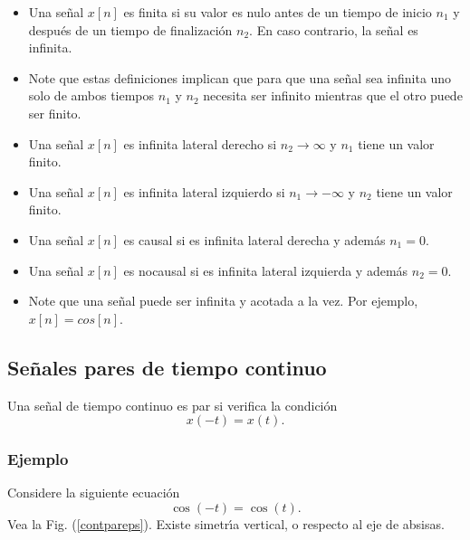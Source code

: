 \begin{itemize}
\item Una se\~{n}al $x[n]$ es finita si su valor es nulo antes de un
  tiempo de inicio $n_{1}$ y despu\'{e}s de un tiempo de
  finalizaci\'{o}n $n_{2}$. En caso contrario, la se\~{n}al es
  infinita.

\item Note que estas definiciones implican que para que una se\~{n}al
  sea infinita uno solo de ambos tiempos $n_{1}$ y $n_{2}$ necesita
  ser infinito mientras que el otro puede ser finito.
        
\item Una se\~{n}al $x[n]$ es infinita lateral derecho si $n_{2}
  \rightarrow \infty$ y $n_{1}$ tiene un valor finito.
        
\item Una se\~{n}al $x[n]$ es infinita lateral izquierdo si $n_{1}
  \rightarrow -\infty$ y $n_{2}$ tiene un valor finito.
        
\item Una se\~{n}al $x[n]$ es causal si es infinita lateral derecha y
  adem\'{a}s $n_{1} = 0$.
        
\item Una se\~{n}al $x[n]$ es nocausal si es infinita lateral
  izquierda y adem\'{a}s $n_{2} = 0$.

\item Note que una se\~{n}al puede ser infinita y acotada a la vez.
  Por ejemplo, $x[n] = cos[n]$.
\end{itemize}

\subsection{Se\~{n}ales pares de tiempo continuo}

Una se\~{n}al de tiempo continuo es par si verifica la condici\'{o}n
\begin{equation}
  x(-t)=x(t).
\end{equation}

\subsubsection{Ejemplo}

Considere la siguiente ecuaci\'{o}n
\begin{equation}
  \cos (-t)=\cos (t).
\end{equation}
Vea la Fig. (\ref{contpareps}). Existe simetr\'{\i}a vertical, o
respecto al eje de absisas.

